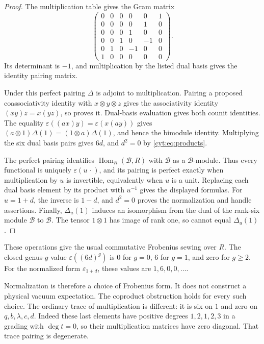\begin{proof}
The multiplication table gives the Gram matrix
\[
 \begin{pmatrix}
 0&0&0&0&0&1\\
 0&0&0&0&1&0\\
 0&0&0&1&0&0\\
 0&0&1&0&-1&0\\
 0&1&0&-1&0&0\\
 1&0&0&0&0&0
 \end{pmatrix}.
\]
Its determinant is \(-1\), and multiplication by the listed
dual basis gives the identity pairing matrix.

Under this perfect pairing \(\Delta\) is adjoint to
multiplication. Pairing a proposed coassociativity identity
with \(x\otimes y\otimes z\) gives the associativity
identity \((xy)z=x(yz)\), so proves it. Dual-basis evaluation
gives both counit identities. The equality
\(\varepsilon((ax)y)=\varepsilon(x(ay))\) gives
\((a\otimes1)\Delta(1)=(1\otimes a)\Delta(1)\),
and hence the bimodule identity. Multiplying the six dual
basis pairs gives \(6d\), and \(d^2=0\) by
\eqref{cyt:eq:products}.

The perfect pairing identifies
\(\operatorname{Hom}_R(\mathcal B,R)\) with \(\mathcal B\)
as a \(\mathcal B\)-module. Thus every functional is
uniquely \(\varepsilon(u\,\cdot)\), and its pairing is
perfect exactly when multiplication by \(u\) is invertible,
equivalently when \(u\) is a unit. Replacing each dual basis
element by its product with \(u^{-1}\) gives the displayed
formulas. For \(u=1+d\), the inverse is \(1-d\), and
\(d^2=0\) proves the normalization and handle assertions.
Finally, \(\Delta_u(1)\) induces an isomorphism from the
dual of the rank-six module \(\mathcal B\) to \(\mathcal B\).
The tensor \(1\otimes1\) has image of rank one, so cannot
equal \(\Delta_u(1)\).
\end{proof}

These operations give the usual commutative Frobenius sewing
over \(R\). The closed genus-\(g\) value
\(\varepsilon((6d)^g)\) is \(0\) for \(g=0\), \(6\)
for \(g=1\), and zero for \(g\geq2\).
For the normalized form \(\varepsilon_{1+d}\), these values
are \(1,6,0,0,\ldots\).

Normalization is therefore a choice
of Frobenius form. It does not construct a physical vacuum
expectation. The coproduct obstruction holds for every such
choice. The ordinary trace of multiplication is different:
it is six on \(1\) and zero on \(q,b,\lambda,c,d\).
Indeed these last elements have positive degrees \(1,2,1,2,3\)
in a grading with \(\deg t=0\), so their multiplication
matrices have zero diagonal. That trace pairing is degenerate.

